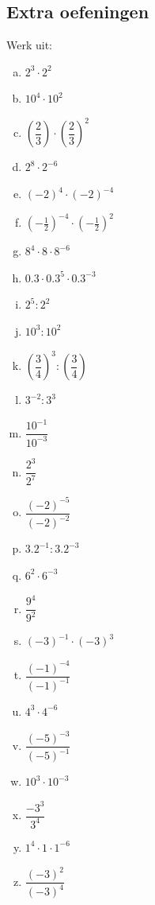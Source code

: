 \documentclass[12pt,twoside,a4paper]{article}
\begin{document}
\subsection{Extra oefeningen}
\begin{oefening}
Werk uit:
\begin{multicols}{3}
  \begin{enumerate}[(a)]
    \itemsep1em
    \item $2^3\cdot 2^2$
    \item $10^4\cdot 10^2$
    \item $\left(\dfrac{2}{3}\right)\cdot \left(\dfrac{2}{3}\right)^2$
    \item $2^8\cdot 2^{-6}$
    \item $\left(-2\right)^4\cdot \left(-2\right)^{-4}$
    \item $\left(-\frac{1}{2}\right)^{-4}\cdot \left(-\frac{1}{2}\right)^2$
    \item $8^4\cdot 8\cdot 8^{-6}$
    \item $0.3\cdot 0.3^5\cdot 0.3^{-3}$
    \item $2^5: 2^2$
    \item $10^3: 10^2$
    \item $\left(\dfrac{3}{4}\right)^3: \left(\dfrac{3}{4}\right)$
    \item $3^{-2}: 3^3$
    \item $\dfrac{10^{-1}}{10^{-3}}$
    \item $\dfrac{2^{3}}{2^{7}}$
    \item $\dfrac{(-2)^{-5}}{(-2)^{-2}}$
    \item $3.2^{-1}:3.2^{-3}$
    \item $6^2\cdot 6^{-3}$
    \item $\dfrac{9^4}{9^2}$
    \item $\left(-3\right)^{-1}\cdot \left(-3\right)^3$
    \item $\dfrac{\left(-1\right)^{-4}}{\left(-1\right)^{-1}}$
    \item $4^3\cdot 4^{-6}$
    \item $\dfrac{\left(-5\right)^{-3}}{\left(-5\right)^{-1}}$
    \item $10^3\cdot 10^{-3}$
    \item $\dfrac{-3^3}{3^4}$
    \item $1^4\cdot1\cdot1^{-6}$
    \item $\dfrac{\left(-3\right)^{2}}{\left(-3\right)^{4}}$
  \end{enumerate}
\end{multicols}
\end{oefening}
\end{document}
